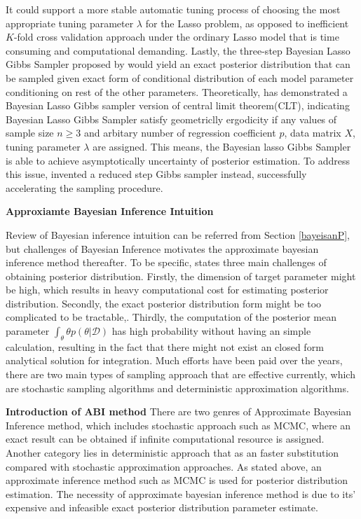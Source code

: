 It could support a more stable automatic tuning process of choosing the most appropriate tuning parameter $\lambda$ for the Lasso problem, as opposed to inefficient $K$-fold cross validation approach under the ordinary Lasso model that is time consuming and computational demanding. Lastly, the three-step Bayesian Lasso Gibbs Sampler proposed by \cite{park_casella_2008} would yield an exact posterior distribution that can be sampled given exact form of conditional distribution of each model parameter conditioning on rest of the other parameters. Theoretically, \cite{khare_hobert_2013} has demonstrated a Bayesian Lasso Gibbs sampler version of central limit theorem(CLT), indicating Bayesian Lasso Gibbs Sampler satisfy geometriclly ergodicity if any values of sample size $n \geq 3$ and arbitary number of regression coefficient $p$, data matrix $X$, tuning parameter $\lambda$ are assigned. This means, the Bayesian lasso Gibbs Sampler is able to achieve asymptotically uncertainty of posterior estimation. To address this issue, \cite{FastBL} invented a reduced step Gibbs sampler instead, successfully accelerating the sampling procedure. 


\textbf{Approxiamte Bayesian Inference Intuition}

Review of Bayesian inference intuition can be referred from Section \ref{bayeisanP}, but challenges of Bayesian Inference motivates the approximate bayesian inference method thereafter. To be specific, \cite{bishop_2006} states three main challenges of obtaining posterior distribution. Firstly, the dimension of target parameter might be high, which results in heavy computational cost for estimating posterior distribution. Secondly, the exact posterior distribution form might be too complicated to be tractable,. Thirdly, the computation of the posterior mean parameter $\int_{\theta} \theta p(\theta|\mathcal{D})$ has high probability without having an simple calculation, resulting in the fact that there might not exist an closed form analytical solution for integration. Much efforts have been paid over the years, there are two main types of sampling approach that are effective currently, which are stochastic sampling algorithms and deterministic approximation algorithms. 

\textbf{Introduction of ABI method}
There are two genres of Approximate Bayesian Inference method, which includes stochastic approach such as MCMC, where an exact result can be obtained if infinite computational resource is assigned. Another category lies in deterministic approach that as an faster substitution compared with stochastic approximation approaches.
As stated above, an approximate inference method such as MCMC is used for posterior distribution estimation. The necessity of approximate bayesian inference method is due to its' expensive and infeasible exact posterior distribution parameter estimate.

